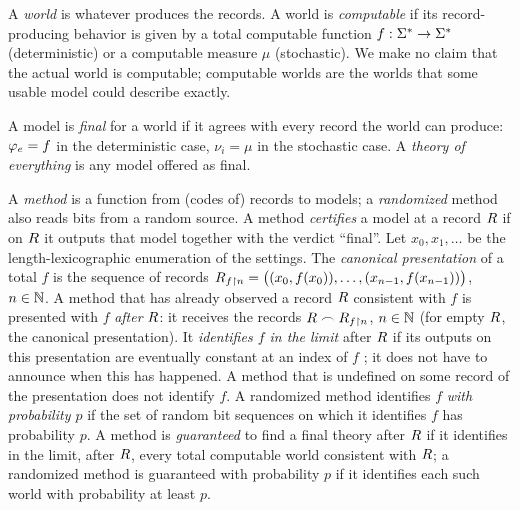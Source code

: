 \begin{definition}[World]\label{def:world}
A \emph{world} is whatever produces the records. A world is \emph{computable} if its
record-producing behavior is given by a total computable function $f:\Sigma^{*}\to\Sigma^{*}$
(deterministic) or a computable measure $\mu$ (stochastic). We make no claim that the
actual world is computable; computable worlds are the worlds that some usable model
could describe exactly.
\end{definition}

\begin{definition}\label{def:final}
A model is \emph{final} for a world if it agrees with every record the world can
produce: $\varphi_{e}=f$ in the deterministic case, $\nu_i=\mu$ in the stochastic case. A
\emph{theory of everything} is any model offered as final.
\end{definition}

\begin{definition}\label{def:learner}
A \emph{method} is a function from (codes of) records to models; a \emph{randomized}
method also reads bits from a random source. A method \emph{certifies} a model at a
record $R$ if on $R$ it outputs that model together with the verdict ``final''.
Let $x_0,x_1,\dots$ be the length-lexicographic enumeration of the settings. The
\emph{canonical presentation} of a total $f$ is the sequence of records
$R_{f\restriction n}=\big((x_0,f(x_0)),\dots,(x_{n-1},f(x_{n-1}))\big)$, $n\in\mathbb{N}$.
A method that has already observed a record $R$ consistent with $f$ is presented
with $f$ \emph{after} $R$: it receives the records $R\frown R_{f\restriction n}$,
$n\in\mathbb{N}$ (for empty $R$, the canonical presentation). It \emph{identifies $f$ in
the limit} after $R$ if its outputs on this presentation are eventually constant at
an index of $f$ \citep{gold1967}; it does not have to announce when this has happened.
A method that is undefined on some record of the presentation does not identify $f$.
A randomized method identifies $f$ \emph{with probability $p$} if the set of random
bit sequences on which it identifies $f$ has probability $p$. A method is
\emph{guaranteed} to find a final theory after $R$ if it identifies in the limit,
after $R$, every total computable world consistent with $R$; a randomized method
is guaranteed with probability $p$ if it identifies each such world with
probability at least $p$.
\end{definition}

